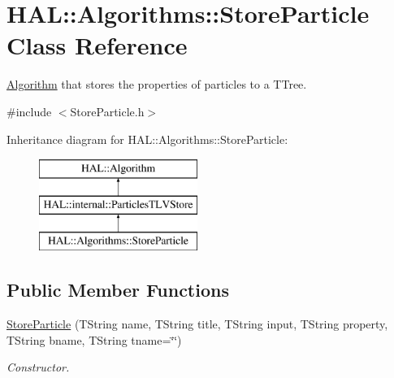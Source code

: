\hypertarget{class_h_a_l_1_1_algorithms_1_1_store_particle}{\section{H\+A\+L\+:\+:Algorithms\+:\+:Store\+Particle Class Reference}
\label{class_h_a_l_1_1_algorithms_1_1_store_particle}
}


\hyperlink{class_h_a_l_1_1_algorithm}{Algorithm} that stores the properties of particles to a T\+Tree.  




{\ttfamily \#include $<$Store\+Particle.\+h$>$}

Inheritance diagram for H\+A\+L\+:\+:Algorithms\+:\+:Store\+Particle\+:\begin{figure}[H]
\begin{center}
\leavevmode
\includegraphics[height=3.000000cm]{class_h_a_l_1_1_algorithms_1_1_store_particle}
\end{center}
\end{figure}
\subsection*{Public Member Functions}
\begin{DoxyCompactItemize}
\item 
\hyperlink{class_h_a_l_1_1_algorithms_1_1_store_particle_a160a46b43875d8968e865fc2335380f3}{Store\+Particle} (T\+String name, T\+String title, T\+String input, T\+String property, T\+String bname, T\+String tname=\char`\"{}\char`\"{})
\begin{DoxyCompactList}\small\item\em Constructor. \end{DoxyCompactList}\end{DoxyCompactItemize}
